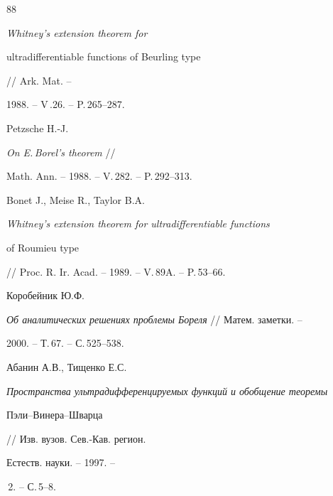 \begin{thebibliography}{88}
{\em Whitney's extension theorem for


ultradifferentiable functions of Beurling type} // Ark. Mat. --


1988. -- V\,.26. -- P.\,265--287.              


 Petzsche H.-J.


{\em On E.\,Borel's theorem} //


Math. Ann. -- 1988. -- V.\,282. -- P.\,292--313.


 Bonet J., Meise R., Taylor B.A. 


{\em Whitney's extension theorem for ultradifferentiable functions 


of Roumieu type} // Proc. R. Ir. Acad. -- 1989. -- V.\,89A. -- P.\,53--66.


 Коробейник Ю.Ф.


{\em Об аналитических решениях проблемы Бореля} // Матем. заметки. -- 


2000. -- Т.\,67. -- С.\,525--538.


 Абанин А.В., Тищенко Е.С.


{\em Пространства ультрадифференцируемых функций и обобщение теоремы 


Пэли--Винера--Шварца} // Изв. вузов. Сев.-Кав. регион. 


Естеств. науки. -- 1997. -- 


\No\,2. -- С.\,5--8. 





\end{thebibliography}





\vskip 2cm












\label{end}





